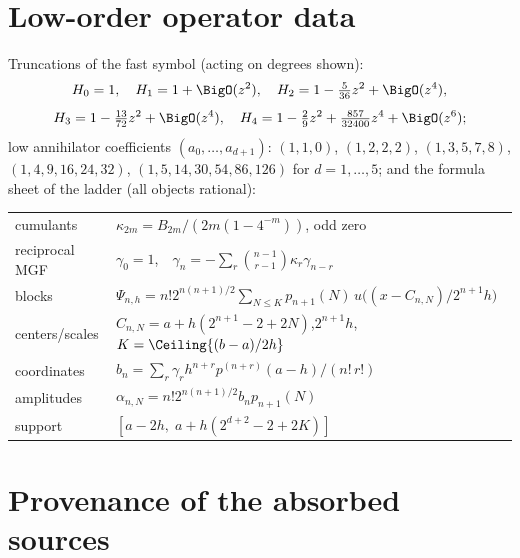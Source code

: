 \documentclass[11pt,oneside]{article}
\numberwithin{equation}{section}
\theoremstyle{definition}
\theoremstyle{remark}
\begin{document}
\appendix

\section{Low-order operator data}
\label{app:operator-data}

Truncations of the fast symbol (acting on degrees shown):
\[
 H_0=1,\quad H_1=1+\BigO(z^{2}),\quad
 H_2=1-\tfrac5{36}z^{2}+\BigO(z^{4}),
\]
\[
 H_3=1-\tfrac{13}{72}z^{2}+\BigO(z^{4}),\quad
 H_4=1-\tfrac29z^{2}+\tfrac{857}{32400}z^{4}+\BigO(z^{6});
\]
low annihilator coefficients $(a_0,\dots,a_{d+1})$:
$(1,1,0)$, $(1,2,2,2)$, $(1,3,5,7,8)$, $(1,4,9,16,24,32)$,
$(1,5,14,30,54,86,126)$ for $d=1,\dots,5$; and the formula sheet of
the ladder (all objects rational):
\begin{center}
\small
\begin{tabular}{@{}ll@{}}
\toprule
cumulants & $\kappa_{2m}=B_{2m}/(2m(1-4^{-m}))$, odd zero\\
reciprocal MGF & $\gamma_0=1$,\ \
$\gamma_n=-\sum_{r}\binom{n-1}{r-1}\kappa_r\gamma_{n-r}$\\
blocks & $\Psi_{n,h}
=n!2^{n(n+1)/2}\sum_{N\le K}p_{n+1}(N)\,
u\bigl((x-C_{n,N})/2^{n+1}h\bigr)$\\
centers/scales & $C_{n,N}=a+h(2^{n+1}-2+2N)$,\quad $2^{n+1}h$,\quad
$K=\Ceiling{(b-a)/2h}$\\
coordinates & $b_n=\sum_r\gamma_rh^{n+r}p^{(n+r)}(a-h)/(n!\,r!)$\\
amplitudes & $\alpha_{n,N}=n!2^{n(n+1)/2}b_np_{n+1}(N)$\\
support & $[a-2h,\;a+h(2^{d+2}-2+2K)]$\\
\bottomrule
\end{tabular}
\end{center}

\section{Provenance of the absorbed sources}
\label{sec:provenance-poly}
\end{document}
